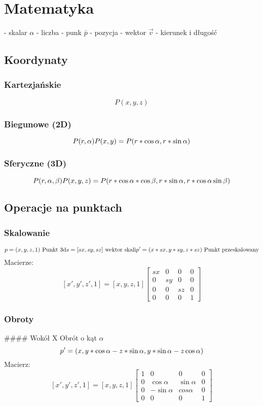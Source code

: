 \documentclass{article}
\begin{document}
\tableofcontents
\newpage
\section{Matematyka}
- skalar $\alpha$ - liczba
- punk $\bar{p}$ - pozycja
- wektor $\vec{v}$ - kierunek i długość

\subsection{Koordynaty}
\subsubsection{Kartezjańskie}
$$P(x, y, z)$$

\subsubsection{Biegunowe (2D)}
$$P(r, \alpha)\\
P(x,y) = P(r * \cos\alpha, r * \sin\alpha)$$
\subsubsection{Sferyczne (3D)}
$$P(r, \alpha, \beta)\\
P(x, y, z) = P(r*\cos\alpha*\cos\beta, r*\sin\alpha, r*\cos\alpha\sin\beta)$$

\subsection{Operacje na punktach}
\subsubsection{Skalowanie}
$$
p = (x,y,z,1)\ \text{Punkt 3d}\\
s = [sx, sy, sz]\ \text{wektor skali}\\
p' = (x * sx, y * sy, z*sz)\ \text{Punkt przeskalowany}\\
$$
Macierze:
$$
[x', y', z', 1] = [x, y, z, 1]
\begin{bmatrix}
sx & 0 & 0 & 0\\
0 & sy & 0 & 0\\
0 & 0 & sz & 0\\
0 & 0 & 0 & 1
\end{bmatrix}
$$

\subsubsection{Obroty}
#### Wokół X
Obrót o kąt $\alpha$
$$
p' = (x,\\
 y* \cos\alpha - z * \sin\alpha,\\
 y*\sin\alpha - z\cos\alpha)
$$
Macierz: 
$$
[x', y', z', 1] = [x,y,z,1]
\begin{bmatrix}
    1 &0&0&0\\
    0&\cos\alpha&\sin\alpha&0\\
    0&-\sin\alpha&cos\alpha&0\\
    0&0&0&1
\end{bmatrix}
$$
\end{document}
